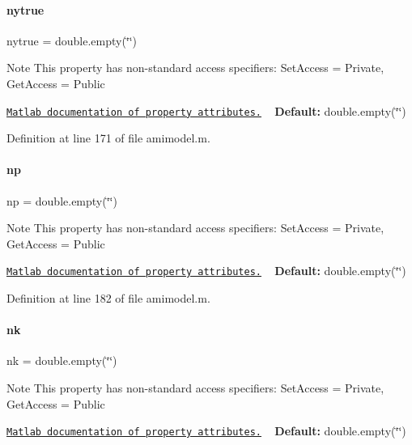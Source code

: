 \paragraph{\texorpdfstring{nytrue}{nytrue}}
{\footnotesize\ttfamily nytrue = double.\+empty(\char`\"{}\char`\"{})}

\begin{DoxyNote}{Note}
This property has non-\/standard access specifiers\+: {\ttfamily Set\+Access = Private, Get\+Access = Public} 

\href{http://www.mathworks.com/help/matlab/matlab_oop/property-attributes.html}{\tt Matlab documentation of property attributes.} ~\newline
{\bfseries Default\+:} double.\+empty(\char`\"{}\char`\"{}) 
\end{DoxyNote}


Definition at line 171 of file amimodel.\+m.

\mbox{\label{classamimodel_a6f6e2fe71b05c4c2f2d967ce9ca02dfd}} 
\paragraph{\texorpdfstring{np}{np}}
{\footnotesize\ttfamily np = double.\+empty(\char`\"{}\char`\"{})}

\begin{DoxyNote}{Note}
This property has non-\/standard access specifiers\+: {\ttfamily Set\+Access = Private, Get\+Access = Public} 

\href{http://www.mathworks.com/help/matlab/matlab_oop/property-attributes.html}{\tt Matlab documentation of property attributes.} ~\newline
{\bfseries Default\+:} double.\+empty(\char`\"{}\char`\"{}) 
\end{DoxyNote}


Definition at line 182 of file amimodel.\+m.

\mbox{\label{classamimodel_afd6bea572754e0c3c320664bdccf0200}} 
\paragraph{\texorpdfstring{nk}{nk}}
{\footnotesize\ttfamily nk = double.\+empty(\char`\"{}\char`\"{})}

\begin{DoxyNote}{Note}
This property has non-\/standard access specifiers\+: {\ttfamily Set\+Access = Private, Get\+Access = Public} 

\href{http://www.mathworks.com/help/matlab/matlab_oop/property-attributes.html}{\tt Matlab documentation of property attributes.} ~\newline
{\bfseries Default\+:} double.\+empty(\char`\"{}\char`\"{}) 
\end{DoxyNote}


